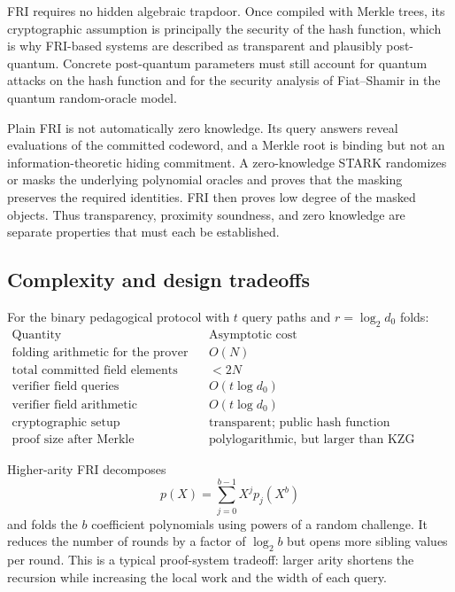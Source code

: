 \begin{remark}
FRI requires no hidden algebraic trapdoor. Once compiled with Merkle trees, its cryptographic
assumption is principally the security of the hash function, which is why FRI-based systems
are described as transparent and plausibly post-quantum. Concrete post-quantum parameters
must still account for quantum attacks on the hash function and for the security analysis of
Fiat--Shamir in the quantum random-oracle model.
\end{remark}

\begin{remark}
Plain FRI is not automatically zero knowledge. Its query answers reveal evaluations of the
committed codeword, and a Merkle root is binding but not an information-theoretic hiding
commitment. A zero-knowledge STARK randomizes or masks the underlying polynomial oracles
and proves that the masking preserves the required identities. FRI then proves low degree of
the masked objects. Thus transparency, proximity soundness, and zero knowledge are separate
properties that must each be established.
\end{remark}

\subsection{Complexity and design tradeoffs}

For the binary pedagogical protocol with $t$ query paths and $r=\log_2d_0$ folds:
\[
\begin{array}{c|c}
\text{Quantity} & \text{Asymptotic cost}\\
\hline
\text{folding arithmetic for the prover} & O(N)\\
\text{total committed field elements} & <2N\\
\text{verifier field queries} & O(t\log d_0)\\
\text{verifier field arithmetic} & O(t\log d_0)\\
\text{cryptographic setup} & \text{transparent; public hash function}\\
\text{proof size after Merkle compilation} & \text{polylogarithmic, but larger than KZG proofs}
\end{array}
\]

Higher-arity FRI decomposes
\[
    p(X)=\sum_{j=0}^{b-1}X^j p_j(X^b)
\]
and folds the $b$ coefficient polynomials using powers of a random challenge. It reduces the
number of rounds by a factor of $\log_2 b$ but opens more sibling values per round. This is a
typical proof-system tradeoff: larger arity shortens the recursion while increasing the local
work and the width of each query.

